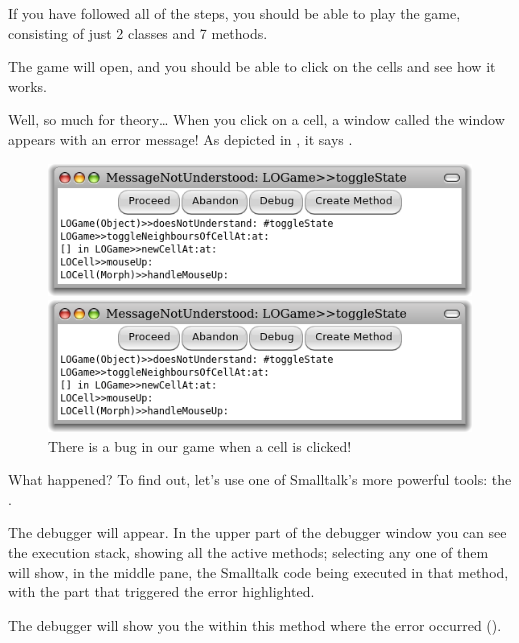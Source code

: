 \documentclass[a4paper,10pt,twoside]{book}
\begin{document}
If you have followed all of the steps, you should be able to play the game, consisting of just 2 classes and 7 methods.


The game will open, and you should be able to click on the cells and see how it works.

Well, so much for theory\ldots{}
When you click on a cell, a  window called the window appears with an error message!
As depicted in , it says .

\begin{figure}[ht]
\ifluluelse
	{\centerline{\includegraphics[width=\textwidth]{Error}}}
	{\centerline{\includegraphics[scale=0.7]{Error}}}
\caption{There is a bug in our game when a cell is clicked!
}
\end{figure}

\noindent
What happened? To find out, let's use one of Smalltalk's more powerful tools: the .

The debugger will appear.
In the upper part of the debugger window you can see the execution stack, showing all the active methods; selecting any one of them will show, in the middle pane, the Smalltalk code being executed in that method, with the part that triggered the error highlighted.

The debugger will show you the  within this method where the error occurred ().
\end{document}
